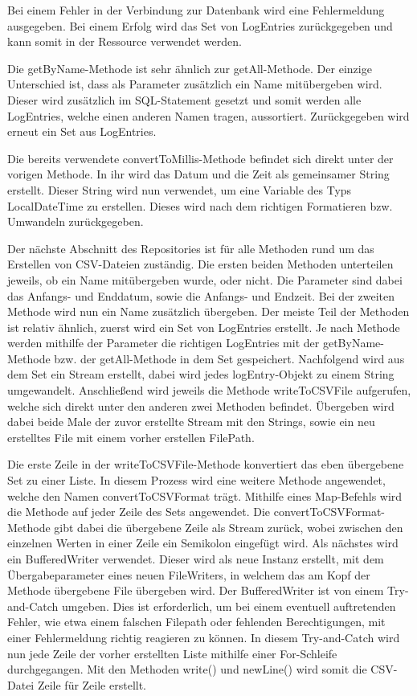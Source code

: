 Bei einem Fehler in der Verbindung zur Datenbank wird eine Fehlermeldung ausgegeben. Bei einem Erfolg wird das Set von LogEntries zurückgegeben und kann somit in der Ressource verwendet werden.
 
Die getByName-Methode ist sehr ähnlich zur getAll-Methode. Der einzige Unterschied ist, dass als Parameter zusätzlich ein Name mitübergeben wird. Dieser wird zusätzlich im SQL-Statement gesetzt und somit werden alle LogEntries, welche einen anderen Namen tragen, aussortiert. Zurückgegeben wird erneut ein Set aus LogEntries.
 
Die bereits verwendete convertToMillis-Methode befindet sich direkt unter der vorigen Methode. In ihr wird das Datum und die Zeit als gemeinsamer String erstellt. Dieser String wird nun verwendet, um eine Variable des Typs LocalDateTime zu erstellen. Dieses wird nach dem richtigen Formatieren bzw. Umwandeln zurückgegeben.
 
Der nächste Abschnitt des Repositories ist für alle Methoden rund um das Erstellen von CSV-Dateien zuständig. Die ersten beiden Methoden unterteilen jeweils, ob ein Name mitübergeben wurde, oder nicht. Die Parameter sind dabei das Anfangs- und Enddatum, sowie die Anfangs- und Endzeit. Bei der zweiten Methode wird nun ein Name zusätzlich übergeben. Der meiste Teil der Methoden ist relativ ähnlich, zuerst wird ein Set von LogEntries erstellt. Je nach Methode werden mithilfe der Parameter die richtigen LogEntries mit der getByName-Methode bzw. der getAll-Methode in dem Set gespeichert. Nachfolgend wird aus dem Set ein Stream erstellt, dabei wird jedes logEntry-Objekt zu einem String umgewandelt. Anschließend wird jeweils die Methode writeToCSVFile aufgerufen, welche sich direkt unter den anderen zwei Methoden befindet. Übergeben wird dabei beide Male der zuvor erstellte Stream mit den Strings, sowie ein neu erstelltes File mit einem vorher erstellen FilePath.
 
Die erste Zeile in der writeToCSVFile-Methode konvertiert das eben übergebene Set zu einer Liste. In diesem Prozess wird eine weitere Methode angewendet, welche den Namen convertToCSVFormat trägt. Mithilfe eines Map-Befehls wird die Methode auf jeder Zeile des Sets angewendet. Die convertToCSVFormat-Methode gibt dabei die übergebene Zeile als Stream zurück, wobei zwischen den einzelnen Werten in einer Zeile ein Semikolon eingefügt wird. Als nächstes wird ein BufferedWriter verwendet. Dieser wird als neue Instanz erstellt, mit dem Übergabeparameter eines neuen FileWriters, in welchem das am Kopf der Methode übergebene File übergeben wird. Der BufferedWriter ist von einem Try-and-Catch umgeben. Dies ist erforderlich, um bei einem eventuell auftretenden Fehler, wie etwa einem falschen Filepath oder fehlenden Berechtigungen, mit einer Fehlermeldung richtig reagieren zu können. In diesem Try-and-Catch wird nun jede Zeile der vorher erstellten Liste mithilfe einer For-Schleife durchgegangen. Mit den Methoden write() und newLine() wird somit die CSV-Datei Zeile für Zeile erstellt.
 
